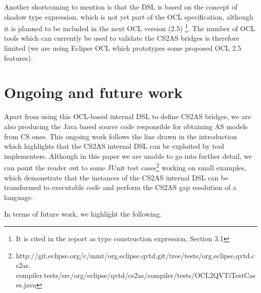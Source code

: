 \documentclass{llncs}
\begin{document}
Another shortcoming to mention is that the DSL is based on the concept of shadow type expression, which is not yet part of the OCL specification, although it is planned to be included in the next OCL version (2.5) \cite{brucker2013aachenReport}\footnote{It is cited in the report as type construction expression, Section 3.1}. The number of OCL tools which can currently be used to validate the CS2AS bridges is therefore limited (we are using Eclipse OCL\cite{eclipseOclOnline} which prototypes some proposed OCL 2.5 features).

\section{Ongoing and future work}
\label{sec:futureWork}

Apart from using this OCL-based internal DSL to define CS2AS bridges, we are also producing the Java based source code responsible for obtaining AS models from CS ones. This ongoing work follows  the line drawn in the introduction which highlights that the CS2AS internal DSL can be exploited by tool implementers. Although in this paper we are unable to go into further detail, we can point the reader out to some JUnit test cases\footnote{http://git.eclipse.org/c/mmt/org.eclipse.qvtd.git/tree/tests/org.eclipse.qvtd.cs2as.
compiler.tests/src/org/eclipse/qvtd/cs2as/compiler/tests/OCL2QVTiTestCases.java} working on small examples, which demonstrate that the instances of the CS2AS internal DSL can be transformed to executable code and perform the CS2AS gap resolution of a language.

In terms of future work, we highlight the following.
\end{document}
